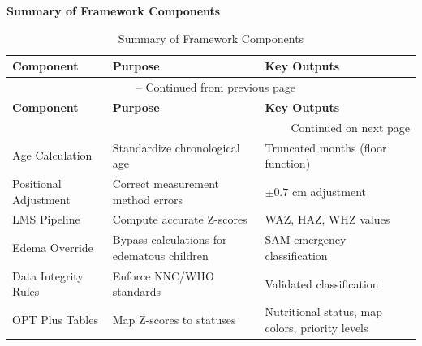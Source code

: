 \documentclass[12pt, a4paper]{report}
\begin{document}
\noindent \textbf{Summary of Framework Components}

\vspace{0.3cm}
\begin{longtable}{p{3.5cm} p{5cm} p{5cm}}
    \caption{Summary of Framework Components} \label{tab:summary_framework} \\
    \toprule
    \textbf{Component} & \textbf{Purpose} & \textbf{Key Outputs} \\
    \midrule
    \endfirsthead
    \multicolumn{3}{c}{{\tablename\ \thetable{} -- Continued from previous page}} \\
    \toprule
    \textbf{Component} & \textbf{Purpose} & \textbf{Key Outputs} \\
    \midrule
    \endhead
    \midrule
    \multicolumn{3}{r}{{Continued on next page}} \\
    \endfoot
    \bottomrule
    \endlastfoot
    Age Calculation & Standardize chronological age & Truncated months (floor function) \\
    \addlinespace
    Positional Adjustment & Correct measurement method errors & \(\pm0.7\) cm adjustment \\
    \addlinespace
    LMS Pipeline & Compute accurate Z-scores & WAZ, HAZ, WHZ values \\
    \addlinespace
    Edema Override & Bypass calculations for edematous children & SAM emergency classification \\
    \addlinespace
    Data Integrity Rules & Enforce NNC/WHO standards & Validated classification \\
    \addlinespace
    OPT Plus Tables & Map Z-scores to statuses & Nutritional status, map colors, priority levels \\
\end{longtable}
\vspace{0.3cm}
\end{document}
